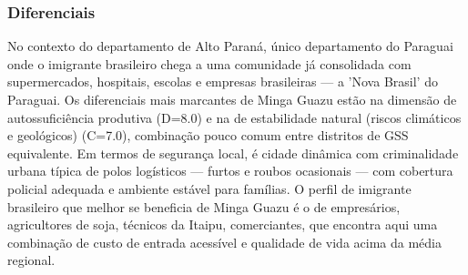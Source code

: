 \subsubsection*{Diferenciais}\label{dif-minga-guazu-1011}
No contexto do departamento de Alto Paraná, único departamento do Paraguai onde o imigrante brasileiro chega a uma comunidade já consolidada com supermercados, hospitais, escolas e empresas brasileiras — a 'Nova Brasil' do Paraguai. Os diferenciais mais marcantes de Minga Guazu estão na dimensão de autossuficiência produtiva (D=8.0) e na de estabilidade natural (riscos climáticos e geológicos) (C=7.0), combinação pouco comum entre distritos de GSS equivalente. Em termos de segurança local, é cidade dinâmica com criminalidade urbana típica de polos logísticos — furtos e roubos ocasionais — com cobertura policial adequada e ambiente estável para famílias. O perfil de imigrante brasileiro que melhor se beneficia de Minga Guazu é o de empresários, agricultores de soja, técnicos da Itaipu, comerciantes, que encontra aqui uma combinação de custo de entrada acessível e qualidade de vida acima da média regional.
